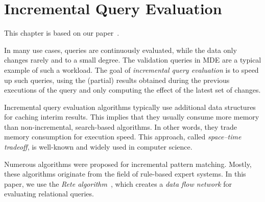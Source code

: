 \chapter{Incremental Query Evaluation}
\label{chp:incremental}

This chapter is based on our paper~\cite{PerPol2017Incremental}.

In many use cases, queries are continuously evaluated, while the data only changes rarely and to a small degree. The validation queries in MDE are a typical example of such a workload. The goal of \emph{incremental query evaluation} is to speed up such queries, using the (partial) results obtained during the previous executions of the query and only computing the effect of the latest set of changes.

Incremental query evaluation algorithms typically
use additional data structures for caching interim results. This implies that they usually consume more memory than non-incremental, search-based algorithms. In other words, they trade memory consumption for execution speed. This approach, called \emph{space--time tradeoff}, is well-known and widely used in computer science.

Numerous algorithms were proposed for incremental pattern matching. Mostly, these algorithms originate from the field of rule-based expert systems. In this paper, we use the \emph{Rete algorithm}~\cite{DBLP:journals/ai/Forgy82}, which creates a \emph{data flow network} for evaluating relational queries. %



